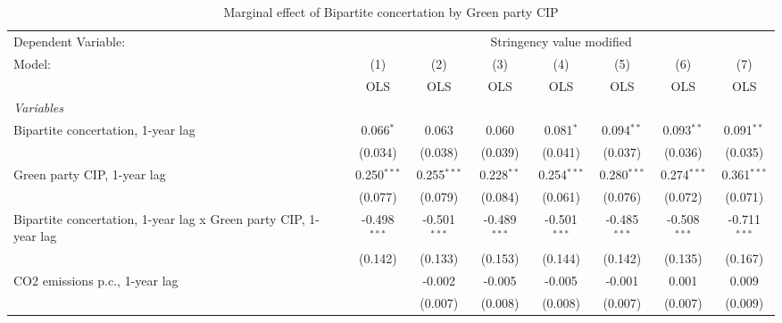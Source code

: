
\begin{table}[htbp]
   \caption{Marginal effect of Bipartite concertation by Green party CIP}
   \centering
   \begin{tabular}{lccccccc}
      \toprule
      Dependent Variable: & \multicolumn{7}{c}{Stringency value modified}\\
      Model:                                                           & (1)            & (2)            & (3)            & (4)            & (5)            & (6)            & (7)\\  
                                                                       &  OLS           & OLS            & OLS            & OLS            & OLS            & OLS            & OLS\\  
      \midrule
      \emph{Variables}\\
      Bipartite concertation, 1-year lag                               & 0.066$^{*}$    & 0.063          & 0.060          & 0.081$^{*}$    & 0.094$^{**}$   & 0.093$^{**}$   & 0.091$^{**}$\\   
                                                                       & (0.034)        & (0.038)        & (0.039)        & (0.041)        & (0.037)        & (0.036)        & (0.035)\\   
      Green party CIP, 1-year lag                                      & 0.250$^{***}$  & 0.255$^{***}$  & 0.228$^{**}$   & 0.254$^{***}$  & 0.280$^{***}$  & 0.274$^{***}$  & 0.361$^{***}$\\   
                                                                       & (0.077)        & (0.079)        & (0.084)        & (0.061)        & (0.076)        & (0.072)        & (0.071)\\   
      Bipartite concertation, 1-year lag x Green party CIP, 1-year lag & -0.498$^{***}$ & -0.501$^{***}$ & -0.489$^{***}$ & -0.501$^{***}$ & -0.485$^{***}$ & -0.508$^{***}$ & -0.711$^{***}$\\   
                                                                       & (0.142)        & (0.133)        & (0.153)        & (0.144)        & (0.142)        & (0.135)        & (0.167)\\   
      CO2 emissions p.c., 1-year lag                                   &                & -0.002         & -0.005         & -0.005         & -0.001         & 0.001          & 0.009\\   
                                                                       &                & (0.007)        & (0.008)        & (0.008)        & (0.007)        & (0.007)        & (0.009)\\   

\end{tabular}
\end{table}
